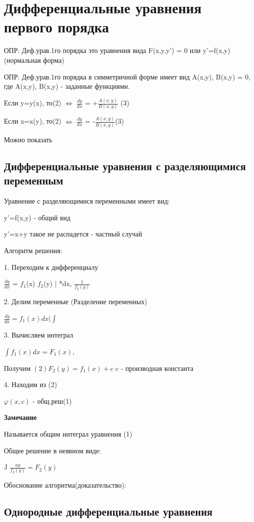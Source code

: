 \documentclass{article}
\begin{document}
\section{Дифференциальные уравнения первого порядка}

ОПР: Деф.урав.1го порядка это уравнения вида F(x,y,y') = 0 или y'=f(x,y) (нормальная форма)

ОПР: Деф.урав.1го порядка в симметричной форме имеет вид A(x,y),  B(x,y) = 0, где A(x,y),  B(x,y) - заданные функциями.

Если y=y(x), то(2) $\iff$  $\frac{dy}{dx}$ = +$\frac{A(x,y)}{B(x,y)}$ (3)

Если x=x(y), то(2) $\iff$  $\frac{dy}{dx}$ = -$\frac{A(x,y)}{B(x,y)}$(3)

Можно показать


\subsection{Дифференциальные уравнения с разделяющимися переменным}

Уравнение с разделяющимися переменными имеет вид:

y'=f(x,y) - общий вид

y'=x+y такое не распадется - частный случай

Алгоритм решения:

 1. Переходим к дифференциалу 
 
    $\frac{dy}{dx}$ = $f_1$(x) $f_2$(y) | *dx, $\frac{1}{ f_2 (y)}$ 

 2. Делим переменные (Разделение переменных)

$ \frac{dy}{dx} = f_1  (x)dx | \int $

 3. Вычисляем интеграл

$\int f_1(x)dx=F_1(x),$

Получим $(2) F_2(y) = f_1(x)+c$ c - производная константа
 

 4. Находим из (2)

  $\varphi(x,c)$ - общ.реш(1)

  

 \textbf{Замечание}

 Называется общим интеграл уравнения (1)

 Общее решение в неявном виде:

 J $\frac{ay}{f_2(y)}=F_2(y)$

 Обоснование алгоритма(доказательство):

 

 \subsection {Однородные дифференциальные уравнения}
\end{document}
